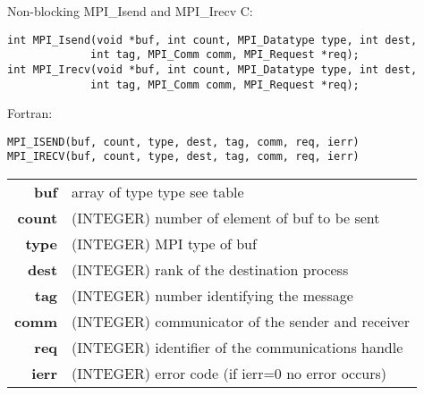 \documentclass[aspectratio=43]{beamer}
\begin{document}
\begin{frame}[fragile]{Non-blocking MPI\_Isend and MPI\_Irecv}
\footnotesize
C:
\vspace{-0.2cm}
\begin{verbatim}
int MPI_Isend(void *buf, int count, MPI_Datatype type, int dest,
             int tag, MPI_Comm comm, MPI_Request *req);
int MPI_Irecv(void *buf, int count, MPI_Datatype type, int dest,
             int tag, MPI_Comm comm, MPI_Request *req);
\end{verbatim}
\vspace{-0.2cm}
Fortran:
\vspace{-0.2cm}
\begin{verbatim}
MPI_ISEND(buf, count, type, dest, tag, comm, req, ierr)
MPI_IRECV(buf, count, type, dest, tag, comm, req, ierr)
\end{verbatim}
\begin{black1block}{}
\begin{tabular}{rl}
    \textbf{buf} & array of type type see table\\
    \textbf{count} & (INTEGER) number of element of buf to be sent\\
    \textbf{type} & (INTEGER) MPI type of buf\\
    \textbf{dest} & (INTEGER) rank of the destination process\\
    \textbf{tag} & (INTEGER) number identifying the message\\
    \textbf{comm} & (INTEGER) communicator of the sender and receiver\\
    \textbf{req} & (INTEGER) identifier of the communications handle\\
    \textbf{ierr} & (INTEGER) error code (if ierr=0 no error occurs)\\
\end{tabular}
\end{black1block}
\end{frame}
\end{document}
